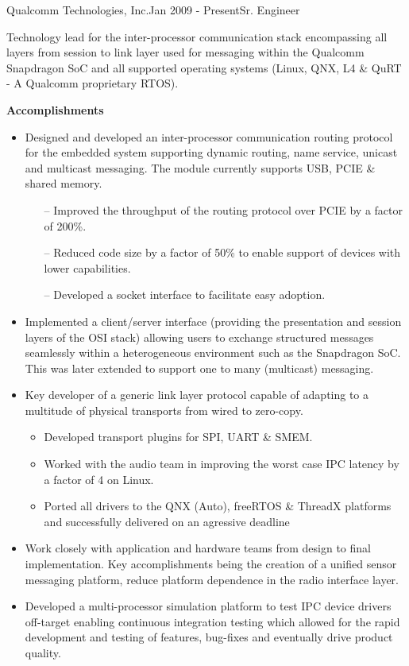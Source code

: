 \begin{rSubsection}{Qualcomm Technologies, Inc.}{Jan 2009 - Present}{Sr. Engineer}{}
  \item[] Technology lead for the inter-processor communication stack encompassing all layers from session to link layer used for messaging within the Qualcomm Snapdragon SoC and all supported operating systems (Linux, QNX, L4 \& QuRT - A Qualcomm proprietary RTOS).
  \item[]
  \item[] \textbf{Accomplishments}
  \begin{itemize}
    \item Designed and developed an inter-processor communication routing protocol for the embedded system supporting dynamic routing, name service, unicast and multicast messaging. The module currently supports USB, PCIE \& shared memory.
    \begin{itemize}
      \item[--] Improved the throughput of the routing protocol over PCIE by a factor of 200\%.
      \item[--] Reduced code size by a factor of 50\% to enable support of devices with lower capabilities.
      \item[--] Developed a socket interface to facilitate easy adoption.
    \end{itemize}
    \item Implemented a client/server interface (providing the presentation and session layers of the OSI stack) allowing users to exchange structured messages seamlessly within a heterogeneous environment such as the Snapdragon SoC. This was later extended to support one to many (multicast) messaging.
    \item Key developer of a generic link layer protocol capable of adapting to a multitude of physical transports from wired to zero-copy.
    \begin{itemize}
     \item Developed transport plugins for SPI, UART \& SMEM.
     \item Worked with the audio team in improving the worst case IPC latency by a factor of 4 on Linux.
     \item Ported all drivers to the QNX (Auto), freeRTOS \& ThreadX platforms and successfully delivered on an agressive deadline
    \end{itemize}
    \item Work closely with application and hardware teams from design to final implementation. Key accomplishments being the creation of a unified sensor messaging platform, reduce platform dependence in the radio interface layer.
    \item Developed a multi-processor simulation platform to test IPC device drivers off-target enabling continuous integration testing which allowed for the rapid development and testing of features, bug-fixes and eventually drive product quality.
  \end{itemize}
\end{rSubsection}

